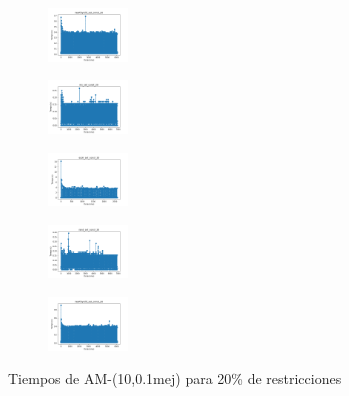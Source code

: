\begin{figure}[H]
\begin{subfigure}
        \centering
        \includegraphics[width=0.234\textwidth]{img/am01mej/newthyroid_set_const_20_49258669_time.png}
    \end{subfigure}
    \hfill
    \begin{subfigure}
        \centering
        \includegraphics[width=0.234\textwidth]{img/am01mej/iris_set_const_20_3773969821_time.png}
    \end{subfigure}
    \hfill
    \begin{subfigure}
        \centering
        \includegraphics[width=0.234\textwidth]{img/am01mej/ecoli_set_const_20_3773969821_time.png}
    \end{subfigure}
    \hfill
    \begin{subfigure}
        \centering
        \includegraphics[width=0.234\textwidth]{img/am01mej/rand_set_const_20_3773969821_time.png}
    \end{subfigure}
    \hfill
    \begin{subfigure}
        \centering
        \includegraphics[width=0.234\textwidth]{img/am01mej/newthyroid_set_const_20_3773969821_time.png}
    \end{subfigure}
    \caption{Tiempos de AM-(10,0.1mej) para 20\% de restricciones}
\end{figure}

